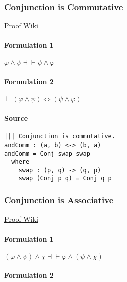 \documentclass{acm_proc_article-sp}
\begin{document}
\subsubsection{Conjunction is
Commutative}\label{conjunction-is-commutative}

\href{https://proofwiki.org/wiki/Rule_of_Commutation/Conjunction}{Proof
Wiki}

\paragraph{Formulation 1}\label{formulation-1}

\(\varphi \land \psi \dashv\vdash \psi \land \varphi\)

\paragraph{Formulation 2}\label{formulation-2}

\(\vdash (\varphi \land \psi) \iff (\psi \land \varphi)\)

\paragraph{Source}\label{source-1}

\begin{verbatim}
||| Conjunction is commutative.
andComm : (a, b) <-> (b, a)
andComm = Conj swap swap
  where
    swap : (p, q) -> (q, p)
    swap (Conj p q) = Conj q p
\end{verbatim}

\subsubsection{Conjunction is
Associative}\label{conjunction-is-associative}

\href{https://proofwiki.org/wiki/Rule_of_Association/Conjunction}{Proof
Wiki}

\paragraph{Formulation 1}\label{formulation-1-1}

\((\varphi \land \psi) \land \chi \dashv\vdash \varphi \land (\psi \land \chi)\)

\paragraph{Formulation 2}\label{formulation-2-1}
\end{document}
